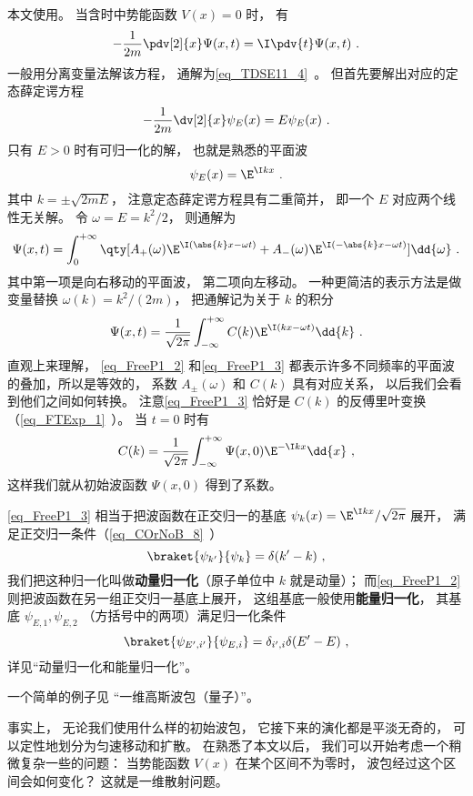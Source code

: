

本文使用。 当含时中势能函数 $V(x) = 0$ 时， 有
\begin{equation}\label{eq_FreeP1_1}
-\frac{1}{2m}\pdv[2]{x}\Psi(x,t) = \I \pdv{t} \Psi(x,t)~.
\end{equation}
一般用分离变量法解该方程， 通解为\autoref{eq_TDSE11_4}~。 但首先要解出对应的定态薛定谔方程
\begin{equation}
-\frac{1}{2m}\dv[2]{x}\psi_E(x) = E \psi_E(x)~.
\end{equation}
只有 $E > 0$ 时有可归一化的解， 也就是熟悉的平面波
\begin{equation}
\psi_E(x) = \E^{\I k x}~.
\end{equation}
其中 $k = \pm\sqrt{2mE}$， 注意定态薛定谔方程具有二重简并， 即一个 $E$ 对应两个线性无关解。 令 $\omega = E = k^2/2$， 则通解为
\begin{equation}\label{eq_FreeP1_2}
\Psi(x,t) = \int_{0}^{+\infty} \qty[A_+(\omega) \E^{\I (\abs{k}x - \omega t)} + A_-(\omega) \E^{\I (-\abs{k}x - \omega t)}] \dd{\omega}~.
\end{equation}
其中第一项是向右移动的平面波， 第二项向左移动。 一种更简洁的表示方法是做变量替换 $\omega(k) = k^2/(2m)$， 把通解记为关于 $k$ 的积分
\begin{equation}\label{eq_FreeP1_3}
\Psi(x,t) = \frac{1}{\sqrt{2\pi}} \int_{-\infty}^{+\infty} C(k) \E^{\I (k x - \omega t)} \dd{k}~.
\end{equation}
直观上来理解， \autoref{eq_FreeP1_2} 和\autoref{eq_FreeP1_3} 都表示许多不同频率的平面波的叠加，所以是等效的， 系数 $A_\pm(\omega)$ 和 $C(k)$ 具有对应关系， 以后我们会看到他们之间如何转换。 注意\autoref{eq_FreeP1_3} 恰好是 $C(k)$ 的反傅里叶变换（\autoref{eq_FTExp_1}~）。 当 $t = 0$ 时有
\begin{equation}
C(k) = \frac{1}{\sqrt{2\pi}} \int_{-\infty}^{+\infty} \Psi(x,0) \E^{-\I k x} \dd{x}~,
\end{equation}
这样我们就从初始波函数 $\Psi(x,0)$ 得到了系数。

\autoref{eq_FreeP1_3} 相当于把波函数在正交归一的基底 $\psi_k(x) = \E^{\I kx}/\sqrt{2\pi}$ 展开， 满足正交归一条件（\autoref{eq_COrNoB_8}~）
\begin{equation}
\braket{\psi_{k'}}{\psi_k} = \delta(k' - k)~,
\end{equation}
我们把这种归一化叫做\textbf{动量归一化}（原子单位中 $k$ 就是动量）； 而\autoref{eq_FreeP1_2} 则把波函数在另一组正交归一基底上展开， 这组基底一般使用\textbf{能量归一化}， 其基底 $\psi_{E,1}, \psi_{E,2}$ （方括号中的两项）满足归一化条件
\begin{equation}
\braket{\psi_{E',i'}}{\psi_{E,i}} = \delta_{i',i}\delta(E' - E)~,
\end{equation}
详见“动量归一化和能量归一化”。

一个简单的例子见 “一维高斯波包（量子）”。

事实上， 无论我们使用什么样的初始波包， 它接下来的演化都是平淡无奇的， 可以定性地划分为匀速移动和扩散。 在熟悉了本文以后， 我们可以开始考虑一个稍微复杂一些的问题： 当势能函数 $V(x)$ 在某个区间不为零时， 波包经过这个区间会如何变化？ 这就是一维散射问题。
